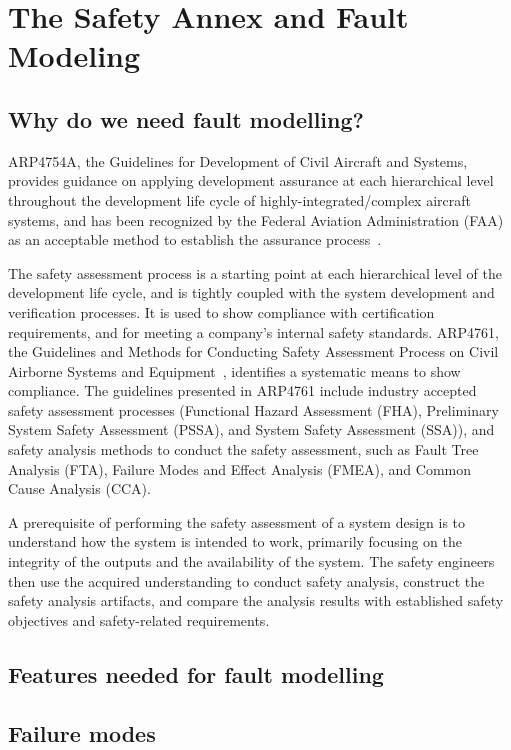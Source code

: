 \section{The Safety Annex and Fault Modeling}
\label{sec:fault_modeling}

\subsection{Why do we need fault modelling?}
ARP4754A, the Guidelines for Development of Civil Aircraft and Systems, provides guidance on applying development assurance at each hierarchical level throughout the development life cycle of highly-integrated/complex aircraft systems, and has been recognized by the Federal Aviation Administration (FAA) as an acceptable method to establish the assurance process~\cite{SAE:ARP4754A}.

The safety assessment process is a starting point at each hierarchical level of the development life cycle, and is tightly coupled with the system development and verification processes. It is used to show compliance with certification requirements, and for meeting a company's internal safety standards. ARP4761, the Guidelines and Methods for Conducting Safety Assessment Process on Civil Airborne Systems and Equipment~\cite{SAE:ARP4761},  identifies a systematic means to show compliance. The guidelines presented in ARP4761 include industry accepted safety assessment processes (Functional Hazard Assessment (FHA), Preliminary System Safety Assessment (PSSA), and System Safety Assessment (SSA)), and safety analysis methods to conduct the safety assessment, 
such as Fault Tree Analysis (FTA), Failure Modes and Effect Analysis (FMEA), and Common Cause Analysis (CCA).

A prerequisite of performing the safety assessment of a system design is to understand how the system is intended to work, primarily focusing on the integrity of the outputs and the availability of the system. The safety engineers then use the acquired understanding to conduct safety analysis, construct the safety analysis artifacts, and compare the analysis results with established safety objectives and safety-related requirements. 


\subsection{Features needed for fault modelling}
\subsection{Failure modes}
